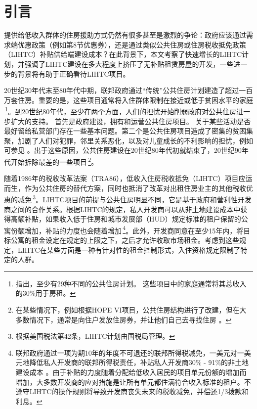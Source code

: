 \documentclass[lang=cn,11pt,a4paper]{paper}
\begin{document}
\section{引言}

提供给低收入群体的住房援助方式仍然有很多甚至是激烈的争论：政府应该通过需求端优惠政策（例如第8节优惠券），还是通过类似公共住房或住房税收抵免政策（LIHTC）补贴供给端建设成本？在此背景下，本文考察了快速增长的LIHTC计划，并强调了LIHTC建设在多大程度上挤压了无补贴租赁房屋的开发，一些进一步的背景将有助于正确看待LIHTC项目。

20世纪30年代末至80年代中期，联邦政府通过“传统”公共住房计划建造了超过一百万套住房。重要的是，这些项目通常将入住群体限制在接近或低于贫困水平的家庭 \citep{Olsen2003365}\,\footnote{\cite{Olsen2003365}指出，至少有29种不同的公共住房计划。 这些项目中的家庭通常将其总收入的30\%用于房租。}。到20世纪80年代，至少在两个方面，人们的担忧开始削弱政府对公共住房进一步扩大的支持。 首先是政府建设，拥有和运营公共住房项目。 关于某些活动是否最好留给私营部门存在一些基本问题。第二个是公共住房项目造成了密集的贫困集聚，加剧了人们对犯罪，邻里关系恶化，以及对儿童成长的不利影响的担忧，例如可参见 \cite{Currie200099,Jencks1990111}。出于这些原因，公共住房建设在20世纪80年代初就结束了，20世纪90年代开始拆除最差的一些项目\,\footnote{在某些情况下，例如根据HOPE VI项目，公共住房结构进行了改建，但在大多数情况下，通常是向住户发放住房券，并让他们自己去寻找住房 \citep{Jacob2004233}。}。

随着1986年的税收改革法案（TRA86），低收入住房税收抵免（LIHTC）项目应运而生，作为公共住房的替代方案，同时也抵消了改革对出租住房业主的其他税收优惠的减免\citep{USCongress1987}\,\footnote{根据美国税法第42条，LIHTC计划由国税局管理。}。LIHTC项目的前提与公共住房明显不同，它是基于政府和营利性开发商之间的合作关系。根据LIHTC的规定，私人开发商可以从非土地建设成本中获得高额补贴，如果收入低于住房和城市发展部（HUD）规定标准的租户保留的公寓份额增加，补贴的力度也会随着增加\,\footnote{联邦政府通过一项为期10年的年度不可退还的联邦所得税减免，一美元对一美元地降低私人开发商的联邦所得税责任，补贴私人开发商30\% - 91\%的非土地建设成本 \cite{Eriksen2009141}。由于补贴的力度随着分配给低收入居民的项目单元份额的增加而增加，大多数开发商的应对措施是让所有单元都住满符合收入标准的租户。不遵守LIHTC的操作规则将导致开发商丧失未来的税收减免，并偿还1/3拨款和利息。}。此外，开发商同意在至少15年内，将目标公寓的租金设定在规定的上限之下，之后才允许收取市场租金。考虑到这些规定，LIHTC在某些方面是一种有针对性的租金控制形式，入住资格规定限制了特定的人群。
\end{document}
